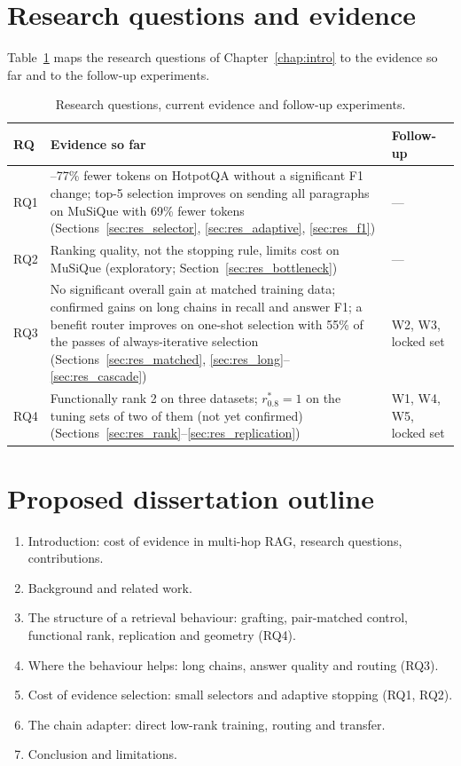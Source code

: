 \section{Research questions and evidence}
\label{sec:plan_rq}

Table~\ref{tab:rq} maps the research questions of Chapter~\ref{chap:intro} to the evidence so far and to the follow-up experiments.

\begin{table}[htbp]
\centering
\caption{Research questions, current evidence and follow-up experiments.}
\label{tab:rq}
\small
\begin{tabularx}{\textwidth}{l>{\raggedright\arraybackslash}X>{\raggedright\arraybackslash}p{3.0cm}}
\toprule
RQ & Evidence so far & Follow-up \\
\midrule
RQ1 & 68--77\% fewer tokens on HotpotQA without a significant F1 change; top-5 selection improves on sending all paragraphs on MuSiQue with 69\% fewer tokens (Sections~\ref{sec:res_selector}, \ref{sec:res_adaptive}, \ref{sec:res_f1}) & --- \\
RQ2 & Ranking quality, not the stopping rule, limits cost on MuSiQue (exploratory; Section~\ref{sec:res_bottleneck}) & --- \\
RQ3 & No significant overall gain at matched training data; confirmed gains on long chains in recall and answer F1; a benefit router improves on one-shot selection with 55\% of the passes of always-iterative selection (Sections~\ref{sec:res_matched}, \ref{sec:res_long}--\ref{sec:res_cascade}) & W2, W3, locked set \\
RQ4 & Functionally rank 2 on three datasets; $r^*_{0.8}=1$ on the tuning sets of two of them (not yet confirmed) (Sections~\ref{sec:res_rank}--\ref{sec:res_replication}) & W1, W4, W5, locked set \\
\bottomrule
\end{tabularx}
\end{table}

\section{Proposed dissertation outline}
\label{sec:plan_outline}

\begin{enumerate}
  \item Introduction: cost of evidence in multi-hop RAG, research questions, contributions.
  \item Background and related work.
  \item The structure of a retrieval behaviour: grafting, pair-matched control, functional rank, replication and geometry (RQ4).
  \item Where the behaviour helps: long chains, answer quality and routing (RQ3).
  \item Cost of evidence selection: small selectors and adaptive stopping (RQ1, RQ2).
  \item The chain adapter: direct low-rank training, routing and transfer.
  \item Conclusion and limitations.
\end{enumerate}

